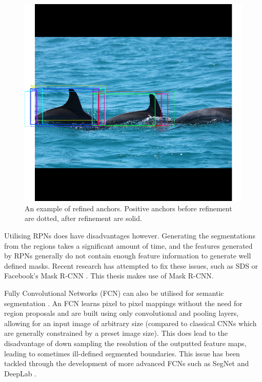 \begin{figure}
	\begin{center}
		\includegraphics[scale=0.3]{Chapter2/figs/rpn-refined.png}
	\end{center}
	\caption{An example of refined anchors. Positive anchors before refinement are dotted, after refinement are solid.}
	\label{fig:rpn-refined}
\end{figure}

Utilising RPNs does have disadvantages however. Generating the segmentations from the regions takes a significant amount of time, and the features generated by RPNs generally do not contain enough feature information to generate well defined masks. Recent research has attempted to fix these issues, such as SDS \cite{hariharan_simultaneous_2014} or Facebook's Mask R-CNN \cite{he_mask_2017}. This thesis makes use of Mask R-CNN.

Fully Convolutional Networks (FCN) can also be utilised for semantic segmentation \cite{long_fully_2014}. An FCN learns pixel to pixel mappings without the need for region proposals and are built using only convolutional and pooling layers, allowing for an input image of arbitrary size (compared to classical CNNs which are generally constrained by a preset image size). This does lead to the disadvantage of down sampling the resolution of the outputted feature maps, leading to sometimes ill-defined segmented boundaries. This issue has been tackled through the development of more advanced FCNs such as SegNet \cite{badrinarayanan_segnet:_2015} and DeepLab \cite{chen_semantic_2014}. 

